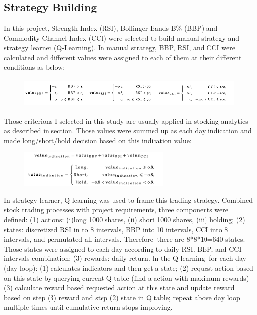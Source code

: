 \documentclass{amia}
\begin{document}
\subsection*{Strategy Building}
In this project, Strength Index (RSI), Bollinger Bands B\% (BBP) and Commodity Channel Index (CCI) were selected to build manual strategy and strategy learner (Q-Learning). 
In manual strategy, BBP, RSI, and CCI were calculated and different values were assigned to each of them at their different conditions as below:
\vspace{-2mm}
\begin{figure}[H]
	\centering
	\includegraphics[height=1.5cm]{pics/ms_val.png}
\end{figure}
\vspace{-5mm}
Those criterions I selected in this study are usually applied in stocking analytics as described in section. Those values were summed up as each day indication and made long/short/hold decision based on this indication value:
\vspace{-2mm}
\begin{figure}[H]
	\centering
	\includegraphics[height=1.8cm]{pics/ms_formula.png}
\end{figure}
\vspace{-5mm}
In strategy learner, Q-learning was used to frame this trading strategy. Combined stock trading processes with project requirements, three components were defined: (1) actions: (i)long 1000 shares, (ii) short 1000 shares, (iii) holding; (2) states: discretized RSI in to 8 intervals, BBP into 10 intervals, CCI into 8 intervals, and permutated all intervals. Therefore, there are 8*8*10=640 states. Those states were assigned to each day according to daily RSI, BBP, and CCI intervals combination; (3) rewards: daily return. In the Q-learning, for each day (day loop): (1) calculates indicators and then get a state; (2) request action based on this state by querying current Q table (find a action with maximum rewards) (3) calculate reward based requested action at this state and update reward based on step (3) reward and step (2) state in Q table; repeat above day loop multiple times until cumulative return stops improving. 
\end{document}
